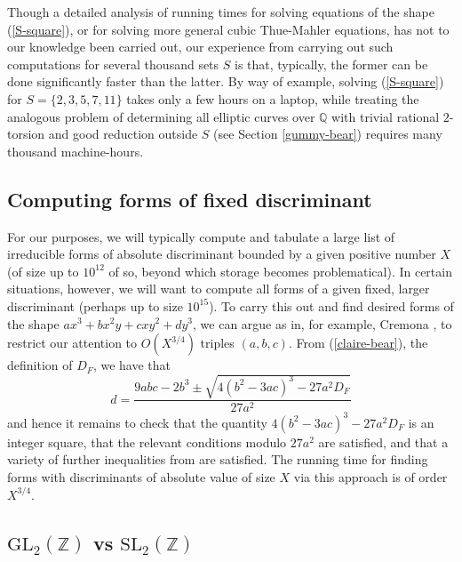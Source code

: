 Though a detailed analysis of running times for solving equations of the shape (\ref{S-square}), or for solving more general cubic Thue-Mahler equations, has not to our knowledge been carried out, our experience from carrying out such computations for several thousand sets $S$ is that, typically,  the former can be done significantly faster than the latter. By way of example, solving (\ref{S-square}) for $S=\{ 2, 3, 5, 7, 11 \}$ takes only a few hours on a laptop, while treating the analogous problem of determining all elliptic curves over $\mathbb{Q}$ with trivial rational $2$-torsion and good reduction outside $S$ (see Section \ref{gummy-bear}) requires many thousand machine-hours.

\subsection{Computing forms of fixed discriminant} \label{pickles}

For our purposes, we will typically compute and tabulate a large list of irreducible forms of absolute discriminant bounded by a given positive number $X$ (of size up to $10^{12}$ of so, beyond which storage becomes problematical). In certain situations, however, we will want to compute all forms of a given fixed, larger discriminant (perhaps up to size $10^{15}$). To carry this out and find desired forms of the shape $ax^3+bx^2y+cxy^2+dy^3$, we can argue as in, for example, Cremona \cite{Cr}, to restrict our attention to $O(X^{3/4})$ triples $(a,b,c)$.
From (\ref{claire-bear}), the definition of $D_F$, we have that
$$
d = \frac{9abc-2b^3 \pm \sqrt{4 (b^2-3ac)^3-27 a^2 D_F}}{27 a^2}
$$
and hence it remains to check that the quantity $4 (b^2-3ac)^3-27 a^2 D_F$ is an integer square, that the relevant conditions modulo $27a^2$ are satisfied, and that a variety of further inequalities from \cite{Cr} are satisfied. The running time for finding forms with discriminants of absolute value of size $X$ via this approach is of order $X^{3/4}$.

\subsection{$\mbox{GL}_2(\mathbb{Z})$ vs $\mbox{SL}_2(\mathbb{Z})$} \label{note}

